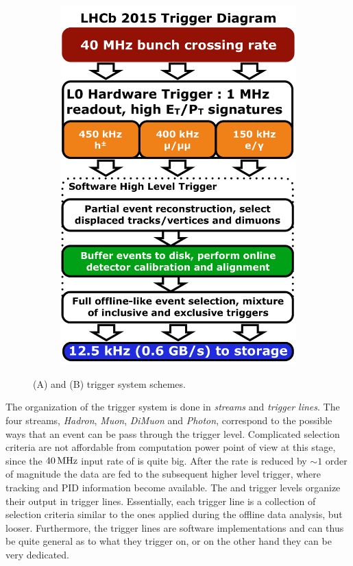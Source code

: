 \begin{figure}[t]
\begin{subfigure}{0.5\textwidth}
    \includegraphics[width=\textwidth]{Figures/Chapter2/LHCb_Trigger_RunII_May2015}
    \caption{}
    \label{det_run_two_trigger}
  \end{subfigure}
  \caption{ \runone (A) and \runtwo (B) trigger system schemes.}
  \label{det_trigger_scheams}
\end{figure}

The organization of the trigger system is done in {\it streams} and {\it trigger lines}.
The four streams, {\it Hadron}, {\it Muon}, {\it DiMuon} and {\it Photon}, correspond to the possible
ways that an event can be pass through the \lzero trigger level. Complicated selection criteria are
not affordable from computation power point of view at this stage, since the $40{\rm \,MHz}$ input rate of \lzero is quite
big. After the rate is reduced by $\sim 1$ order of magnitude the data are fed to the subsequent
higher level trigger, where tracking and PID information become available. The \hltone and \hlttwo
trigger levels organize their output in trigger lines. Essentially, each trigger line is a collection
of selection criteria similar to the ones applied during the offline data analysis, but looser.
Furthermore, the trigger lines are software implementations and can thus be quite general as to what
they trigger on, or on the other hand they can be very dedicated.


